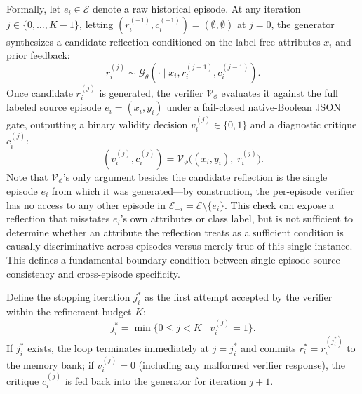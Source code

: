 \documentclass[10pt,a4paper,onecolumn]{article}
\theoremstyle{definition}
\theoremstyle{remark}
\begin{document}
Formally, let $e_i \in \mathcal{E}$ denote a raw historical episode. At any iteration $j \in \{0,\ldots,K-1\}$, letting $(r_i^{(-1)}, c_i^{(-1)}) = (\emptyset, \emptyset)$ at $j=0$, the generator synthesizes a candidate reflection conditioned on the label-free attributes $x_i$ and prior feedback:
\begin{equation}
    r_i^{(j)} \sim \mathcal{G}_\theta(\cdot \mid x_i, r_i^{(j-1)}, c_i^{(j-1)}).
    \label{eq:ref_gen}
\end{equation}
Once candidate $r_i^{(j)}$ is generated, the verifier $\mathcal{V}_\phi$ evaluates it against the full labeled source episode $e_i = (x_i, y_i)$ under a fail-closed native-Boolean JSON gate, outputting a binary validity decision $v_i^{(j)} \in \{0, 1\}$ and a diagnostic critique $c_i^{(j)}$:
\begin{equation}
    (v_i^{(j)}, c_i^{(j)}) = \mathcal{V}_\phi\big((x_i, y_i),\; r_i^{(j)}\big).
    \label{eq:verifier}
\end{equation}
Note that $\mathcal{V}_\phi$'s only argument besides the candidate reflection is the single episode $e_i$ from which it was generated---by construction, the per-episode verifier has no access to any other episode in $\mathcal{E}_{-i} = \mathcal{E} \setminus \{e_i\}$. This check can expose a reflection that misstates $e_i$'s own attributes or class label, but is not sufficient to determine whether an attribute the reflection treats as a sufficient condition is causally discriminative across episodes versus merely true of this single instance. This defines a fundamental boundary condition between single-episode source consistency and cross-episode specificity.

Define the stopping iteration $j_i^*$ as the first attempt accepted by the verifier within the refinement budget $K$:
\begin{equation}
    j_i^* = \min\big\{0 \le j < K \;\big|\; v_i^{(j)} = 1\big\}.
    \label{eq:stop_j}
\end{equation}
If $j_i^*$ exists, the loop terminates immediately at $j = j_i^*$ and commits $r_i^* = r_i^{(j_i^*)}$ to the memory bank; if $v_i^{(j)} = 0$ (including any malformed verifier response), the critique $c_i^{(j)}$ is fed back into the generator for iteration $j+1$.
\end{document}
